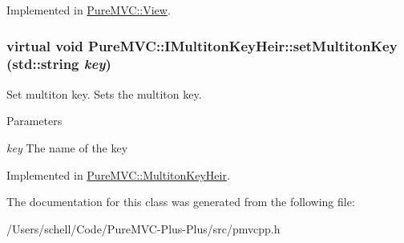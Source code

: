 Implemented in \hyperlink{class_pure_m_v_c_1_1_view_a108934f0fe48f40f715a0f310d40a26e}{PureMVC::View}.\hypertarget{class_pure_m_v_c_1_1_i_multiton_key_heir_a03acb75ab79defba2c28b8de1bbe1ca6}{
\subsubsection[{setMultitonKey}]{\setlength{\rightskip}{0pt plus 5cm}virtual void PureMVC::IMultitonKeyHeir::setMultitonKey (std::string {\em key})}}
\label{class_pure_m_v_c_1_1_i_multiton_key_heir_a03acb75ab79defba2c28b8de1bbe1ca6}


Set multiton key. Sets the multiton key. 
\begin{DoxyParams}{Parameters}
\item[{\em key}]The name of the key \end{DoxyParams}


Implemented in \hyperlink{class_pure_m_v_c_1_1_multiton_key_heir_abc70ef7c066bc8d7bf0196ec727599bb}{PureMVC::MultitonKeyHeir}.

The documentation for this class was generated from the following file:\begin{DoxyCompactItemize}
\item 
/Users/schell/Code/PureMVC-\/Plus-\/Plus/src/pmvcpp.h\end{DoxyCompactItemize}
